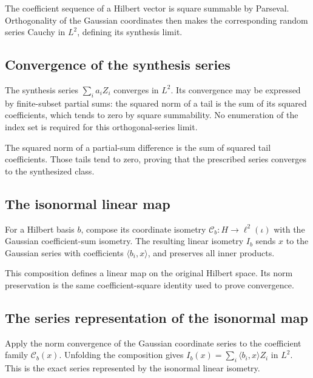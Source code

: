 \documentclass[11pt,a4paper]{report}
\begin{document}
The coefficient sequence of a Hilbert vector is square summable by Parseval. Orthogonality of the Gaussian coordinates then makes the corresponding random series Cauchy in \(L^2\), defining its synthesis limit.

\subsection{\texorpdfstring{Convergence of the synthesis series}{Convergence of the synthesis series}}
\label{report-step-UnadjustedLangevin-GaussianHilbert-lean-11}


The synthesis series \(\sum_i a_iZ_i\) converges in \(L^2\). Its convergence may be expressed by finite-subset partial sums: the squared norm of a tail is the sum of its squared coefficients, which tends to zero by square summability. No enumeration of the index set is required for this orthogonal-series limit.



The squared norm of a partial-sum difference is the sum of squared tail coefficients. Those tails tend to zero, proving that the prescribed series converges to the synthesized class.

\subsection{\texorpdfstring{The isonormal linear map}{The isonormal linear map}}
\label{report-step-UnadjustedLangevin-GaussianHilbert-lean-12}


For a Hilbert basis \(b\), compose its coordinate isometry \(\mathcal C_b:H\to\ell^2(\iota)\) with the Gaussian coefficient-sum isometry. The resulting linear isometry \(I_b\) sends \(x\) to the Gaussian series with coefficients \(\langle b_i,x\rangle\), and preserves all inner products.



This composition defines a linear map on the original Hilbert space. Its norm preservation is the same coefficient-square identity used to prove convergence.

\subsection{\texorpdfstring{The series representation of the isonormal map}{The series representation of the isonormal map}}
\label{report-step-UnadjustedLangevin-GaussianHilbert-lean-13}


Apply the norm convergence of the Gaussian coordinate series to the coefficient family \(\mathcal C_b(x)\). Unfolding the composition gives \(I_b(x)=\sum_i\langle b_i,x\rangle Z_i\) in \(L^2\). This is the exact series represented by the isonormal linear isometry.
\end{document}
